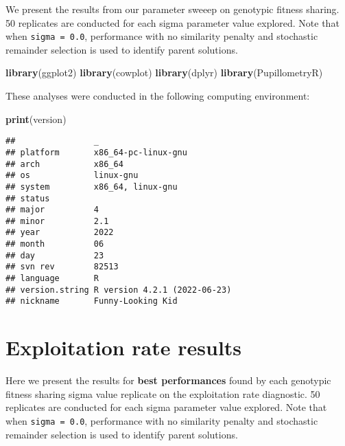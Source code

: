 \documentclass[]{book}
\newenvironment{Shaded}{\begin{snugshade}}{\end{snugshade}}
\newcommand{\KeywordTok}[1]{\textcolor[rgb]{0.13,0.29,0.53}{\textbf{#1}}}
\newcommand{\NormalTok}[1]{#1}
\begin{document}
We present the results from our parameter sweeep on genotypic fitness sharing.
50 replicates are conducted for each sigma parameter value explored.
Note that when \texttt{sigma\ =\ 0.0}, performance with no similarity penalty and stochastic remainder selection is used to identify parent solutions.

\begin{Shaded}
\begin{Highlighting}[]
\KeywordTok{library}\NormalTok{(ggplot2)}
\KeywordTok{library}\NormalTok{(cowplot)}
\KeywordTok{library}\NormalTok{(dplyr)}
\KeywordTok{library}\NormalTok{(PupillometryR)}
\end{Highlighting}
\end{Shaded}

These analyses were conducted in the following computing environment:

\begin{Shaded}
\begin{Highlighting}[]
\KeywordTok{print}\NormalTok{(version)}
\end{Highlighting}
\end{Shaded}

\begin{verbatim}
##                _                           
## platform       x86_64-pc-linux-gnu         
## arch           x86_64                      
## os             linux-gnu                   
## system         x86_64, linux-gnu           
## status                                     
## major          4                           
## minor          2.1                         
## year           2022                        
## month          06                          
## day            23                          
## svn rev        82513                       
## language       R                           
## version.string R version 4.2.1 (2022-06-23)
## nickname       Funny-Looking Kid
\end{verbatim}

\hypertarget{exploitation-rate-results-3}{%
\section{Exploitation rate results}\label{exploitation-rate-results-3}}

Here we present the results for \textbf{best performances} found by each genotypic fitness sharing sigma value replicate on the exploitation rate diagnostic.
50 replicates are conducted for each sigma parameter value explored.
Note that when \texttt{sigma\ =\ 0.0}, performance with no similarity penalty and stochastic remainder selection is used to identify parent solutions.
\end{document}
